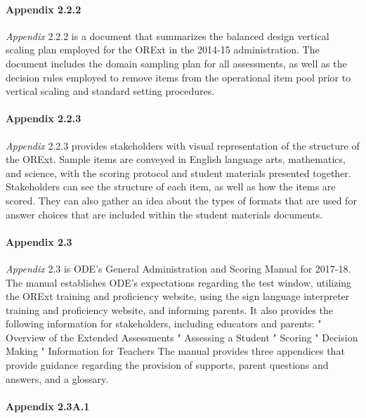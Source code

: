 \documentclass[]{article}
\let\oldparagraph\paragraph
\renewcommand{\paragraph}[1]{\oldparagraph{#1}\mbox{}}
\begin{document}
\paragraph{Appendix 2.2.2}\label{appendix-2.2.2}

\emph{Appendix} 2.2.2 is a document that summarizes the balanced design
vertical scaling plan employed for the ORExt in the 2014-15
administration. The document includes the domain sampling plan for all
assessments, as well as the decision rules employed to remove items from
the operational item pool prior to vertical scaling and standard setting
procedures.

\paragraph{Appendix 2.2.3}\label{appendix-2.2.3}

\emph{Appendix} 2.2.3 provides stakeholders with visual representation
of the structure of the ORExt. Sample items are conveyed in English
language arts, mathematics, and science, with the scoring protocol and
student materials presented together. Stakeholders can see the structure
of each item, as well as how the items are scored. They can also gather
an idea about the types of formats that are used for answer choices that
are included within the student materials documents.

\paragraph{Appendix 2.3}\label{appendix-2.3}

\emph{Appendix} 2.3 is ODE's General Administration and Scoring Manual
for 2017-18. The manual establishes ODE's expectations regarding the
test window, utilizing the ORExt training and proficiency website, using
the sign language interpreter training and proficiency website, and
informing parents. It also provides the following information for
stakeholders, including educators and parents: " Overview of the
Extended Assessments " Assessing a Student " Scoring " Decision Making "
Information for Teachers The manual provides three appendices that
provide guidance regarding the provision of supports, parent questions
and answers, and a glossary.

\paragraph{Appendix 2.3A.1}\label{appendix-2.3a.1}
\end{document}
